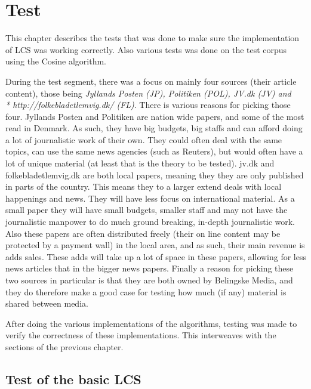 \chapter{Test}

This chapter describes the tests that was done to make sure the implementation of LCS was working correctly. Also various tests was done on the test corpus using the Cosine algorithm. 

During the test segment, there was a focus on mainly four sources (their article content), those being \textit{Jyllands Posten (JP), Politiken (POL), JV.dk (JV) and \\* http://folkebladetlemvig.dk/ (FL)}. There is various reasons for picking those four. Jyllands Posten and Politiken are nation wide papers, and some of the most read in Denmark. As such, they have big budgets, big staffs and can afford doing a lot of journalistic work of their own. They could often deal with the same topics, can use the same news agencies (such as Reuters), but would often have a lot of unique material (at least that is the theory to be tested). jv.dk and folkebladetlemvig.dk are both local papers, meaning they they are only published in parts of the country. This means they to a larger extend deals with local happenings and news. They will have less focus on international material. As a small paper they will have small budgets, smaller staff and may not have the journalistic manpower to do much ground breaking, in-depth journalistic work. Also these papers are often distributed freely (their on line content may be protected by a payment wall) in the local area, and as such, their main revenue is adds sales. These adds will take up a lot of space in these papers, allowing for less news articles that in the bigger news papers. Finally a reason for picking these two sources in particular is that they are both owned by Belingske Media, and they do therefore make a good case for testing how much (if any) material is shared between media.

After doing the various implementations of the algorithms, testing was made to verify the correctness of these implementations. This interweaves with the sections of the previous chapter.

\section{Test of the basic LCS}

